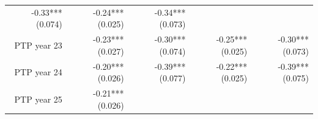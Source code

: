 \documentclass[]{article}
\begin{document}
\begin{longtable}[c]{@{}rrrrr@{}}
\begin{minipage}[t]{0.16\columnwidth}
-0.33*** (0.074)
\strut\end{minipage} &
\begin{minipage}[t]{0.21\columnwidth}\raggedleft\strut
-0.24*** (0.025)
\strut\end{minipage} &
\begin{minipage}[t]{0.15\columnwidth}\raggedleft\strut
-0.34*** (0.073)
\strut\end{minipage}\tabularnewline
\begin{minipage}[t]{0.17\columnwidth}\raggedleft\strut
PTP year 23
\strut\end{minipage} &
\begin{minipage}[t]{0.18\columnwidth}\raggedleft\strut
-0.23*** (0.027)
\strut\end{minipage} &
\begin{minipage}[t]{0.16\columnwidth}\raggedleft\strut
-0.30*** (0.074)
\strut\end{minipage} &
\begin{minipage}[t]{0.21\columnwidth}\raggedleft\strut
-0.25*** (0.025)
\strut\end{minipage} &
\begin{minipage}[t]{0.15\columnwidth}\raggedleft\strut
-0.30*** (0.073)
\strut\end{minipage}\tabularnewline
\begin{minipage}[t]{0.17\columnwidth}\raggedleft\strut
PTP year 24
\strut\end{minipage} &
\begin{minipage}[t]{0.18\columnwidth}\raggedleft\strut
-0.20*** (0.026)
\strut\end{minipage} &
\begin{minipage}[t]{0.16\columnwidth}\raggedleft\strut
-0.39*** (0.077)
\strut\end{minipage} &
\begin{minipage}[t]{0.21\columnwidth}\raggedleft\strut
-0.22*** (0.025)
\strut\end{minipage} &
\begin{minipage}[t]{0.15\columnwidth}\raggedleft\strut
-0.39*** (0.075)
\strut\end{minipage}\tabularnewline
\begin{minipage}[t]{0.17\columnwidth}\raggedleft\strut
PTP year 25
\strut\end{minipage} &
\begin{minipage}[t]{0.18\columnwidth}\raggedleft\strut
-0.21*** (0.026)
\strut\end{minipage} &
\begin{minipage}[t]{0.16\columnwidth}\raggedleft\strut

\end{minipage}
\end{longtable}
\end{document}
